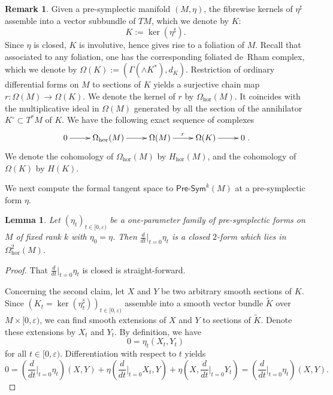 \documentclass[11pt,thmsa]{amsart}
\newtheorem{lemma}[theorem]{Lemma}
\theoremstyle{definition}
\newtheorem{remark}[theorem]{Remark}
\newcommand{\Presym}{\mathsf{Pre}\textrm{-}\mathsf{Sym}}
\newcommand{\hor}{\mathrm{hor}}
\newcommand{\Fol}{K}
\begin{document}
\begin{remark}
Given a pre-symplectic manifold $(M,\eta)$, the fibrewise kernels of 
$\eta^\sharp$ assemble into a vector subbundle of $TM$, which we denote by $K$:
$$K:=\ker(\eta^\sharp).$$
Since $\eta$ is closed, $K$ is involutive, hence gives
rise to a foliation of $M$.
Recall that associated to any foliation, one has the corresponding foliated
de~Rham complex, which we denote by
$\Omega(K):=(\Gamma(\wedge K^*),d_\Fol).$
Restriction of ordinary differential forms on $M$ to sections of $K$ yields a surjective chain map
$r: \Omega(M) \to \Omega(K)$.
We denote the kernel of $r$ by $\Omega_\hor(M)$. It coincides with the multiplicative ideal
in $\Omega(M)$ generated by all the section of the annihilator $K^\circ \subset T^*M$ of $K$. We have the following exact sequence of complexes
\begin{equation}\label{eq:ses}
\xymatrix{
0 \ar[r] &\Omega_\hor(M) \ar[r] & \Omega(M) \ar[r]^r & \Omega(K)\ar[r] & 0
}.
\end{equation}
We denote the cohomology of $\Omega_\hor(M)$ by $H_\hor(M)$, and the cohomology of $\Omega(K)$
by $H(K)$.
\end{remark}



We next compute the formal tangent space to
$\Presym^k(M)$ at a pre-symplectic form $\eta$.
 
\begin{lemma}\label{lemma: tangent space to pre-sym}
Let $(\eta_t)_{t\in [0,\varepsilon)}$ be a one-parameter family of pre-symplectic forms on $M$
of fixed rank $k$ with $\eta_0=\eta$.
Then $\frac{d}{dt}\vert_{t=0}\eta_t$ is a closed $2$-form which lies in 
$\Omega^2_\hor(M)$.
\end{lemma}

\begin{proof}
That $\frac{d}{dt}\vert_{t=0}\eta_t$ is closed is straight-forward.

Concerning the second claim, let $X$ and $Y$ be two arbitrary smooth sections
of $K$. Since $(K_t=\ker(\eta_t^\sharp))_{t\in [0,\varepsilon)}$ assemble into a smooth vector bundle $\tilde{K}$ over
$M\times [0,\varepsilon)$, we can find smooth extensions of $X$ and $Y$ to
sections of $\tilde{K}$. Denote these extensions by $X_t$ and $Y_t$.
By definition, we have
$$ 0=\eta_t(X_t,Y_t)$$
for all $t\in [0,\varepsilon)$. Differentiation with respect to $t$ yields
$$  0= \left(\frac{d}{dt}\vert_{t=0}\eta_t\right)(X,Y) + \eta(\frac{d}{dt}\vert_{t=0}X_t, Y) + \eta(X,\frac{d}{dt}\vert_{t=0}Y_t) = \left(\frac{d}{dt}\vert_{t=0}\eta_t\right)(X,Y).$$
\end{proof}
\end{document}
